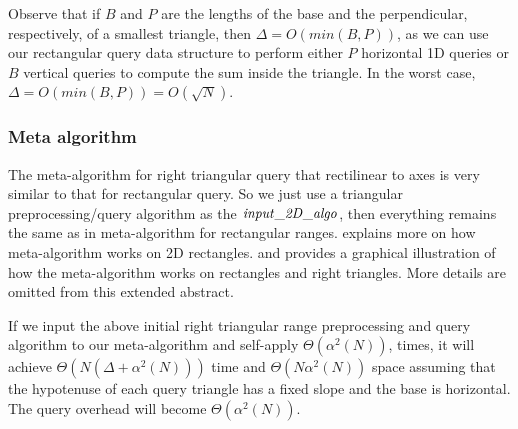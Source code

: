 Observe that if $B$ and $P$ are the lengths of the base and the
perpendicular, respectively, of a smallest triangle, then $\Delta = O(
min(B, P) )$, as we can use our rectangular query data structure to
perform either $P$ horizontal 1D queries or $B$ vertical queries to
compute the sum inside the triangle. In the worst case, $\Delta = O(
min(B, P) ) = O( \sqrt{N} )$.


\subsubsection*{Meta algorithm}
The meta-algorithm for right triangular query that rectilinear to
axes is very similar to that for rectangular query. So we just use a
triangular preprocessing/query algorithm as the $\id{input\_2D\_algo}$,
then everything remains the same as in meta-algorithm for rectangular
ranges.   explains more on how meta-algorithm works on 2D
rectangles.  and  provides
a graphical illustration of how the meta-algorithm works on rectangles
and right triangles. More details are omitted from this extended abstract.

\begin{theorem}
If we input the above initial right triangular range preprocessing and
query algorithm to our meta-algorithm and self-apply $\Theta(\alpha^2(N))$,
times, it will achieve $\Theta( N(\Delta + \alpha^{2}{(N)}))$ time and
$\Theta( N \alpha^{2}{(N)} )$ space assuming that the hypotenuse of each
query triangle has a fixed slope and the base is horizontal. The query
overhead will become $\Theta(\alpha^2(N))$.
\label{thm:metaRightTri}
\end{theorem}

